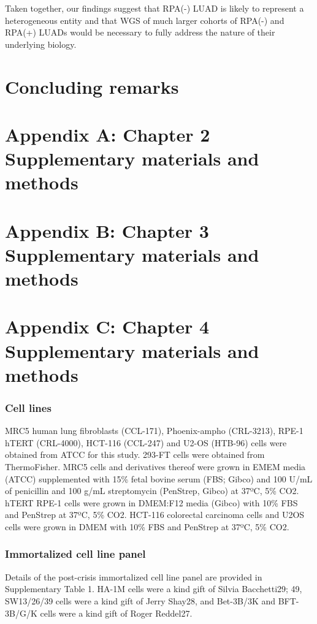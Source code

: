 \documentclass[phd,tocprelim]{cornell}
\begin{document}
Taken together, our findings suggest that RPA(-) LUAD is likely to represent a heterogeneous entity and that WGS of much larger cohorts of RPA(-) and RPA(+) LUADs would be necessary to fully address the nature of their underlying biology.

\chapter{Concluding remarks}


\appendix
\chapter{Appendix A: Chapter 2 Supplementary materials and methods}

\chapter{Appendix B: Chapter 3 Supplementary materials and methods}

\chapter{Appendix C: Chapter 4 Supplementary materials and methods}
\subsection*{Cell lines}
MRC5 human lung fibroblasts (CCL-171), Phoenix-ampho (CRL-3213), RPE-1 hTERT (CRL-4000), HCT-116 (CCL-247) and U2-OS (HTB-96) cells were obtained from ATCC for this study. 293-FT cells were obtained from ThermoFisher. MRC5 cells and derivatives thereof were grown in EMEM media (ATCC) supplemented with 15\% fetal bovine serum (FBS; Gibco) and 100 U/mL of penicillin and 100 \textmu g/mL streptomycin (PenStrep, Gibco) at 37ºC, 5\% CO2. hTERT RPE-1 cells were grown in DMEM:F12 media (Gibco) with 10\% FBS and PenStrep at 37ºC, 5\% CO2. HCT-116 colorectal carcinoma cells and U2OS cells were grown in DMEM with 10\% FBS and PenStrep at 37ºC, 5\% CO2.

\subsection*{Immortalized cell line panel}
Details of the post-crisis immortalized cell line panel are provided in Supplementary Table 1. HA-1M cells were a kind gift of Silvia Bacchetti29; 49, SW13/26/39 cells were a kind gift of Jerry Shay28, and Bet-3B/3K and BFT-3B/G/K cells were a kind gift of Roger Reddel27.
\end{document}
